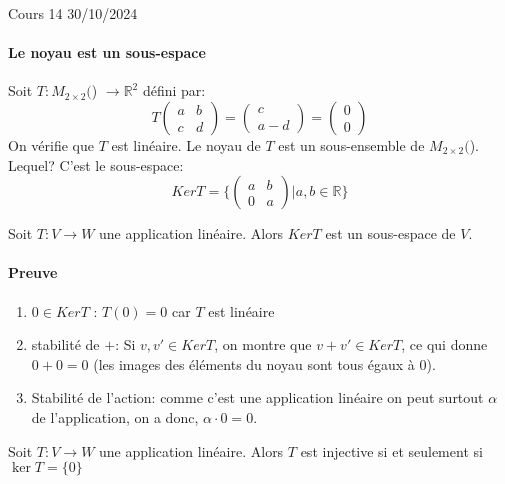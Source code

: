 \begin{formule
} Cours 14 30/10/2024
\end{formule
}
\paragraph{Le noyau est un sous-espace}
\begin{exemple}
Soit $T : M_{2\times 2}($\R) $\to \mathbb{R}^2$ défini par:
\[T\begin{pmatrix}
    a & b \\ c & d
\end{pmatrix} = \begin{pmatrix}
    c \\ a-d
\end{pmatrix} = \begin{pmatrix}
    0 \\ 0
\end{pmatrix}\]
On vérifie que $T$ est linéaire. Le noyau de $T$ est un sous-ensemble de $M_{2\times 2}($\R). Lequel? C'est le sous-espace:
\[Ker T = \{ \begin{pmatrix}
    a & b \\ 0 & a
\end{pmatrix}|a, b \in \mathbb{R}\}\]
\end{exemple}

\begin{theoreme}
    Soit $T: V \to W$ une application linéaire. Alors $KerT$ est un sous-espace de $V$.
\end{theoreme}

\paragraph{Preuve}
\begin{enumerate}
    \item $0 \in Ker T$ : $T(0) = 0$ car $T$ est linéaire
    \item stabilité de $+$: Si $v, v' \in KerT$, on montre que $v+v' \in KerT$, ce qui donne $0 + 0 = 0$ (les images des éléments du noyau sont tous égaux à 0).
    \item Stabilité de l'action: comme c'est une application linéaire on peut surtout $\alpha$ de l'application, on a donc, $\alpha \cdot 0 = 0$.
\end{enumerate}


\begin{definition}
Soit $T : V \to W$ une application linéaire. Alors $T$ est injective si et seulement si $\ker T = \{0\}$ 
\end{definition}


